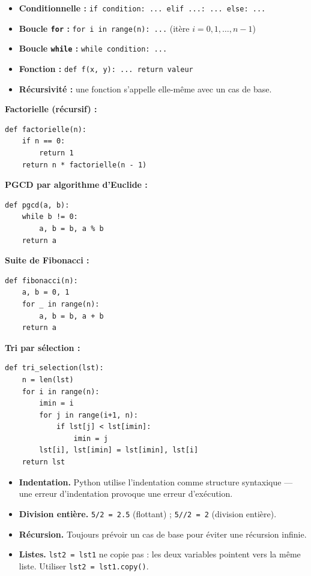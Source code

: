 \documentclass[11pt,a4paper,twoside]{book}
\begin{document}
\begin{methodebox}
\begin{itemize}
  \item \textbf{Conditionnelle :} \texttt{if condition: ... elif ...: ... else: ...}
  \item \textbf{Boucle \texttt{for} :} \texttt{for i in range(n): ...} (itère $i=0,1,\ldots,n-1$)
  \item \textbf{Boucle \texttt{while} :} \texttt{while condition: ...}
  \item \textbf{Fonction :} \texttt{def f(x, y): ... return valeur}
  \item \textbf{Récursivité :} une fonction s'appelle elle-même avec un cas de base.
\end{itemize}
\end{methodebox}

\begin{exemplebox}
\textbf{Factorielle (récursif) :}
\begin{verbatim}
def factorielle(n):
    if n == 0:
        return 1
    return n * factorielle(n - 1)
\end{verbatim}

\textbf{PGCD par algorithme d'Euclide :}
\begin{verbatim}
def pgcd(a, b):
    while b != 0:
        a, b = b, a % b
    return a
\end{verbatim}

\textbf{Suite de Fibonacci :}
\begin{verbatim}
def fibonacci(n):
    a, b = 0, 1
    for _ in range(n):
        a, b = b, a + b
    return a
\end{verbatim}

\textbf{Tri par sélection :}
\begin{verbatim}
def tri_selection(lst):
    n = len(lst)
    for i in range(n):
        imin = i
        for j in range(i+1, n):
            if lst[j] < lst[imin]:
                imin = j
        lst[i], lst[imin] = lst[imin], lst[i]
    return lst
\end{verbatim}
\end{exemplebox}

\begin{erreurbox}
\begin{itemize}
  \item \textbf{Indentation.} Python utilise l'indentation comme structure syntaxique — une erreur d'indentation provoque une erreur d'exécution.
  \item \textbf{Division entière.} \texttt{5/2 = 2.5} (flottant) ; \texttt{5//2 = 2} (division entière).
  \item \textbf{Récursion.} Toujours prévoir un cas de base pour éviter une récursion infinie.
  \item \textbf{Listes.} \texttt{lst2 = lst1} ne copie pas : les deux variables pointent vers la même liste. Utiliser \texttt{lst2 = lst1.copy()}.
\end{itemize}
\end{erreurbox}
\end{document}
